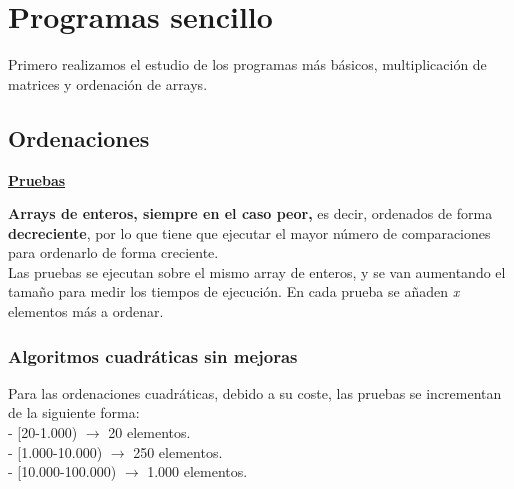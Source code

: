 \section{Programas sencillo}

Primero realizamos el estudio de los programas más básicos, multiplicación de matrices y ordenación de arrays.

	\subsection{Ordenaciones}
	
	\begin{flushleft}
	\begin{mdframed}[roundcorner=5pt]
	
		\textbf{\underline{Pruebas}}
		\vspace{0.1cm}
		
		\scriptsize	
		\textbf{Arrays de enteros, siempre en el caso peor,} es decir, ordenados de forma \textbf{decreciente}, por lo que tiene que ejecutar el mayor número de comparaciones para ordenarlo de forma creciente.\\	
		Las pruebas se ejecutan sobre el mismo array de enteros, y se van aumentando el tamaño para medir los tiempos de ejecución. En cada prueba se añaden \textit{x} elementos más a ordenar.	
		
		
	\end{mdframed}
	\end{flushleft}	
	
	
		\subsubsection{Algoritmos cuadráticas sin mejoras}		
		
		\begin{tcolorbox}[boxrule=0.5pt, fontupper=\small]
			\scriptsize
			Para las ordenaciones cuadráticas, debido a su coste, las pruebas se incrementan de la siguiente forma:\\
			- [20-1.000) $\rightarrow$ 20 elementos.\\
			- [1.000-10.000) $\rightarrow$ 250 elementos.\\
			- [10.000-100.000) $\rightarrow$ 1.000 elementos.		
		\end{tcolorbox}
		
